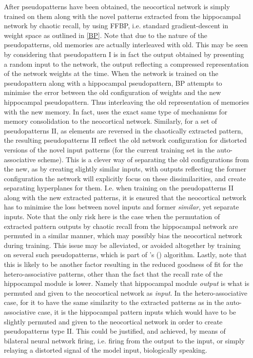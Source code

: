 After pseudopatterns have been obtained, the neocortical network is simply trained on them along with the novel patterns extracted from the hippocampal network by chaotic recall, by using FFBP, i.e. standard gradient-descent in weight space as outlined in \ref{BP}. Note that due to the nature of the pseudopatterns, old memories are actually interleaved with old. This may be seen by considering that pseudopattern I is in fact the output obtained by presenting a random input to the network, the output reflecting a compressed representation of the network weights at the time. When the network is trained on the pseudopattern along with a hippocampal pseudopattern, BP attempts to minimise the error between the old configuration of weights and the new hippocampal pseudopattern. Thus interleaving the old representation of memories with the new memory. In fact, \cite{Hattori2014} uses the exact same type of mechanisms for memory consolidation to the neocortical network.
Similarly, for a set of pseudopatterns II, as elements are reversed in the chaotically extracted pattern, the resulting pseudopatterns II reflect the old network configuration for distorted versions of the novel input patterns (for the current training set in the auto-associative scheme). This is a clever way of separating the old configurations from the new, as by creating slightly similar inputs, with outputs reflecting the former configuration the network will explicitly focus on these dissimilarities, and create separating hyperplanes for them. I.e. when training on the pseudopatterns II along with the new extracted patterns, it is ensured that the neocortical network has to minimise the loss between novel inputs and former \textit{similar}, yet separate inputs. Note that the only risk here is the case when the permutation of extracted pattern outputs by chaotic recall from the hippocampal network are permuted in a similar manner, which may possibly bias the neocortical network during training. This issue may be alleviated, or avoided altogether by training on several such pseudopatterns, which is part of \citeauthor{Hattori2014}'s (\citeyear{Hattori2014}) algorithm. Lastly, note that this is likely to be another factor resulting in the reduced goodness of fit for the hetero-associative patterns, other than the fact that the recall rate of the hippocampal module is lower. Namely that hippocampal module \textit{output} is what is permuted and given to the neocortical network as \textit{input}. In the hetero-associative case, for it to have the same similarity to the extracted patterns as in the auto-associative case, it is the hippocampal pattern inputs which would have to be slightly permuted and given to the neocortical network in order to create pseudopatterns type II. This could be justified, and achieved, by means of bilateral neural network firing, i.e. firing from the output to the input, or simply relaying a distorted signal of the model input, biologically speaking.

